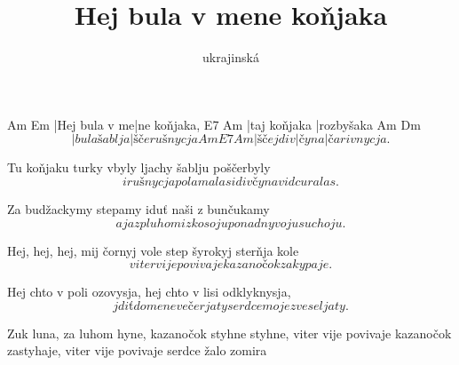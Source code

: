 \documentclass{song}
\title{Hej bula v mene koňjaka}
\author{ukrajinská}
\begin{document}
\strophe
Am            Em
|Hej bula v me|ne koňjaka,
E7           Am
|taj koňjaka |rozbyšaka
   Am           Dm
\[ |bula šablja |šče rušnycja
Am        E7    Am
|šče j div|čyna |čarivnycja. \]
\endstrophe

\strophe*
Tu koňjaku turky vbyly
ljachy šablju poščerbyly
\[ i rušnycja polamalas
i divčyna vidcuralas. \]
\endstrophe

\strophe*
Za budžackymy stepamy
iduť naši z bunčukamy
\[ a ja z pluhom i z kosoju
ponad nyvoju suchoju. \]
\endstrophe

\strophe*
Hej, hej, hej, mij čornyj vole
step šyrokyj sterňja kole
\[ viter vije povivaje
kazanočok zakypaje. \]
\endstrophe

\strophe*
Hej chto v poli ozovysja,
hej chto v lisi odklyknysja,
\[ jdiť do mene večerjaty
serdce moje zveseljaty. \]
\endstrophe

\strophe*
Zuk luna, za luhom hyne,
kazanočok styhne styhne,
viter vije povivaje
kazanočok zastyhaje,
viter vije povivaje
serdce žalo zomira
\endstrophe
\end{document}
